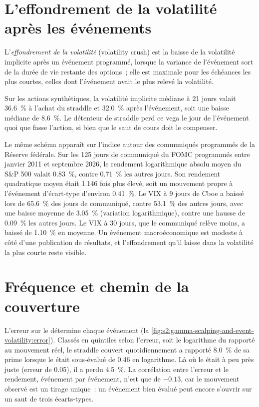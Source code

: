 \section{L'effondrement de la volatilité après les événements}

\begin{definition}\label{def:s2:gamma-scalping-and-event-volatility:crush}
L'\emph{effondrement de la volatilité} (volatility crush) est la baisse de la volatilité implicite après un événement programmé, lorsque la variance de l'événement sort
de la durée de vie restante des options~; elle est maximale pour les échéances les plus courtes, celles dont l'événement avait le plus relevé la volatilité.
\end{definition}

Sur les actions synthétiques, la volatilité implicite médiane à 21 jours valait 36.6~\% à l'achat du straddle et 32.0~\% après l'événement, soit une baisse médiane de 8.6~\%. Le
détenteur de straddle perd ce vega le jour de l'événement quoi que fasse l'action, si bien que le saut de cours doit le compenser.

Le même schéma apparaît sur l'indice autour des communiqués programmés de la Réserve fédérale. Sur les 125 jours de communiqué du FOMC programmés entre janvier 2011 et
septembre 2026, le rendement logarithmique absolu moyen du S\&P 500 valait 0.83~\%, contre 0.71~\% les autres jours. Son rendement quadratique moyen était 1.146 fois plus élevé,
soit un mouvement propre à l'événement d'écart-type d'environ 0.41~\%. Le VIX à 9 jours de Cboe a baissé lors de 65.6~\% des jours de communiqué, contre 53.1~\% des autres jours, avec une baisse moyenne de
3.05~\% (variation logarithmique), contre une hausse de 0.09~\% les autres jours. Le VIX à 30 jours, que le communiqué relève moins, a baissé de 1.10~\% en moyenne.
Un événement macroéconomique est modeste à côté d'une publication de résultats, et l'effondrement qu'il laisse dans la volatilité la plus courte reste visible.

\section{Fréquence et chemin de la couverture}

L'erreur sur le  détermine chaque événement (la \cref{fig:s2:gamma-scalping-and-event-volatility:error}). Classés en quintiles selon l'erreur, soit le logarithme du  rapporté au mouvement réel, le
straddle couvert quotidiennement a rapporté 8.0~\% de sa prime lorsque le  était sous-évalué de 0.46 en logarithme. Là où le 
était à peu près juste (erreur de 0.05), il a perdu 4.5~\%. La corrélation entre l'erreur et le rendement, événement par événement, n'est que de $-0.13$, car le
mouvement observé est un tirage unique~: un événement bien évalué peut encore s'ouvrir sur un saut de trois écarts-types.

